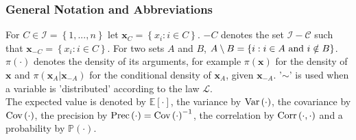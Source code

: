 \subsubsection*{General Notation and Abbreviations}
For $C\in\mathcal{I}=\left\lbrace1,...,n\right\rbrace$ let $\pmb{x}_C=\left\lbrace x_i:i\in C\right\rbrace$. $-C$ denotes the set $\mathcal{I-C}$ such that $\pmb{x}_{-C}=\left\lbrace x_i:i\in C\right\rbrace$. For two sets $A$ and $B$, $A\setminus B=\left\lbrace i:i\in A \hbox{ and } i \notin B\right\rbrace$. \\
$\pi\left(\cdot\right)$ denotes the density of its arguments, for example $\pi\left(\pmb{x}\right)$ for the density of $\pmb{x}$ and $\pi\left(\pmb{x}_A|\pmb{x}_{-A}\right)$ for the conditional density of $\pmb{x}_A$, given $\pmb{x}_{-A}$. '$\sim$' is used when a variable is 'distributed' according to the law $\mathcal{L}$.  \\
The expected value is denoted by $\mathbb{E}\left[\cdot\right]$, the variance by $\hbox{Var}\left(\cdot\right)$, the covariance by $\hbox{Cov}\left(\cdot\right)$, the precision by $\hbox{Prec}\left(\cdot\right)=\hbox{Cov}\left(\cdot\right)^{-1}$, the correlation by $\hbox{Corr}\left(\cdot,\cdot\right)$ and a probability by $\mathbb{P}\left(\cdot\right)$.
